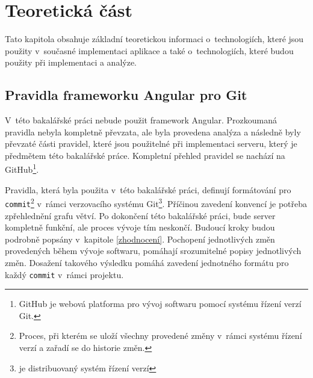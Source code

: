 \chapter{Teoretická část}\label{chapter:resere}
Tato kapitola obsahuje základní teoretickou informaci o~technologiích, které jsou použity v~současné implementaci aplikace a také o~technologiích, které budou použity při implementaci a analýze.

\section{Pravidla frameworku Angular pro Git}\label{reserse:git}
    V~této bakalářské práci nebude použit framework Angular. Prozkoumaná pravidla nebyla kompletně převzata, ale byla provedena analýza a následně byly převzaté části pravidel, které jsou použitelné při implementaci serveru, který je předmětem této bakalářské práce. Kompletní přehled pravidel se nachází na GitHub\footnote{ GitHub je webová platforma pro vývoj softwaru pomocí systému řízení verzí Git.}\cite{angular-git}.
    
    Pravidla, která byla použita v~této bakalářské práci, definují formátování pro \verb|commit|\footnote{Proces, při kterém se uloží všechny provedené změny v~rámci systému řízení verzí a zařadí se do historie změn.} v~rámci verzovacího systému Git\footnote{je distribuovaný systém řízení verzí}. Příčinou zavedení konvencí je potřeba zpřehlednění grafu větví. Po dokončení této bakalářské práci, bude server kompletně funkční, ale proces vývoje tím neskončí. Budoucí kroky budou podrobně popsány v~kapitole \ref{zhodnocení}. Pochopení jednotlivých změn provedených během vývoje softwaru, pomáhají srozumitelné popisy jednotlivých změn. Dosažení takového výsledku pomáhá zavedení jednotného formátu pro každý \verb|commit| v~rámci projektu.
    
